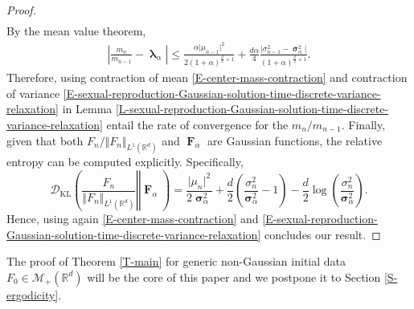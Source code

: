 \documentclass[reqno]{amsart}
\DeclareMathOperator{\blambda}{\boldsymbol{\lambda}}
\DeclareMathOperator{\bsigma}{\boldsymbol{\sigma}}
\DeclareMathOperator{\bF}{\boldsymbol{F}}
\numberwithin{equation}{section}
\begin{document}
{\begin{proof}
\begin{align*}
\end{align*}
By the mean value theorem,
\begin{align*}
\left\vert\frac{m_n}{m_{n-1}}-\blambda_\alpha\right\vert\leq \frac{\alpha \vert \mu_{n-1}\vert^2}{2(1+\alpha)^{\frac{d}{2}+1}}+\frac{d\alpha}{4}\frac{\vert \sigma_{n-1}^2-\bsigma_\alpha^2\vert}{(1+\alpha)^{\frac{d}{2}+1}}.
\end{align*}
Therefore, using contraction of mean \eqref{E-center-mass-contraction} and contraction of variance \eqref{E-sexual-reproduction-Gaussian-solution-time-discrete-variance-relaxation} in Lemma \ref{L-sexual-reproduction-Gaussian-solution-time-discrete-variance-relaxation} entail the rate of convergence for the $m_n/m_{n-1}$. Finally, given that both $F_n/\Vert F_n\Vert_{L^1(\mathbb{R}^d)}$ and $\bF_\alpha$ are Gaussian functions, the relative entropy can be computed explicitly. Specifically,
$$
\mathcal{D}_{\text{KL}}\left(\left.\frac{F_n}{\Vert F_n\Vert_{L^1(\mathbb{R}^d)}}\right\Vert \bF_\alpha\right)=\frac{\vert \mu_n\vert^2}{2\bsigma_\alpha^2}+\frac{d}{2}\left(\frac{\sigma_n^2}{\bsigma_\alpha^2}-1\right)-\frac{d}{2}\log\left(\frac{\sigma_n^2}{\bsigma_\alpha^2}\right).
$$
Hence, using again \eqref{E-center-mass-contraction} and \eqref{E-sexual-reproduction-Gaussian-solution-time-discrete-variance-relaxation} concludes our result.
\end{proof}

The proof of Theorem \ref{T-main} for generic non-Gaussian initial data $F_0\in \mathcal{M}_+(\mathbb{R}^d)$ will be the core of this paper and we postpone it to Section \ref{S-ergodicity}.

}
\end{document}
